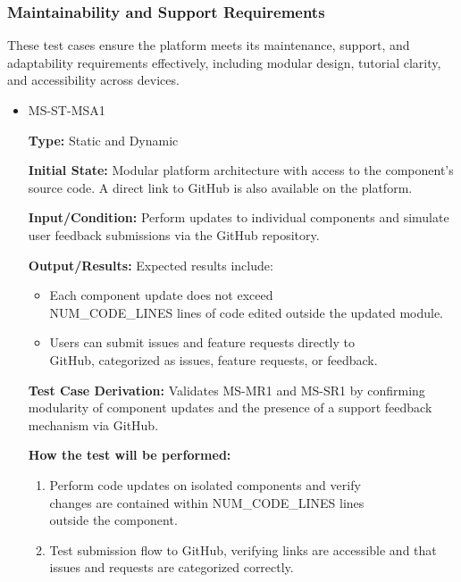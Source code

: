 \documentclass[12pt, titlepage]{article}
\begin{document}
\subsubsection{Maintainability and Support Requirements}

\hspace{2em}These test cases ensure the platform meets its maintenance, support, and adaptability requirements effectively, including modular design, tutorial clarity, and accessibility across devices.

\begin{itemize} 
  \item MS-ST-MSA1
  \begin{mdframed}[linewidth=0.5mm] 
    \textbf{Type:} Static and Dynamic \par 
    \textbf{Initial State:} Modular platform architecture with access to the component’s source code. A direct link to GitHub is also available on the platform. \par 
    \textbf{Input/Condition:} Perform updates to individual components and simulate user feedback submissions via the GitHub repository. \par 
    \textbf{Output/Results:} Expected results include: 
    \begin{itemize} 
      \item Each component update does not exceed \\NUM\_CODE\_LINES lines of code edited outside the updated module.
      \item Users can submit issues and feature requests directly to \\GitHub, categorized as issues, feature requests, or feedback.
    \end{itemize} \par
    \textbf{Test Case Derivation:} Validates MS-MR1 and MS-SR1 by confirming modularity of component updates and the presence of a support feedback mechanism via GitHub. \par
    \textbf{How the test will be performed:} 
    \begin{enumerate}[noitemsep] 
      \item Perform code updates on isolated components and verify \\changes are contained within NUM\_CODE\_LINES lines \\outside the component. 
      \item Test submission flow to GitHub, verifying links are accessible and that issues and requests are categorized correctly. 
    \end{enumerate} 
  \end{mdframed}


\end{itemize}
\end{document}
